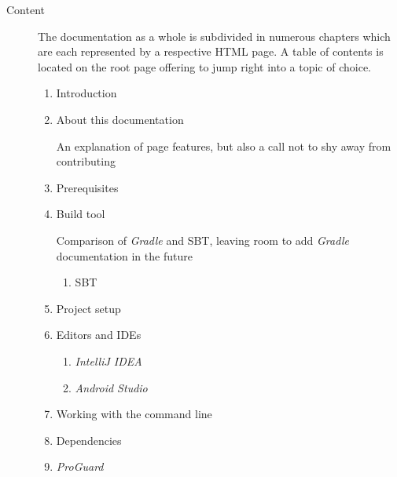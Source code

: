 \begin{description}

	\item[Content]\hfill

	The documentation as a whole is subdivided in numerous chapters which are each represented by a respective \ac{HTML} page. A table of contents is located on the root page offering to jump right into a topic of choice.

	\begin{enumerate}

		\item Introduction

		\item About this documentation

		An explanation of page features, but also a call not to shy away from contributing

		\item Prerequisites

		\item Build tool

		Comparison of \textit{Gradle} and \ac{SBT}, leaving room to add \textit{Gradle} documentation in the future

		\begin{enumerate}

			\item \ac{SBT}

		\end{enumerate}

		\item Project setup

		\item Editors and \acp{IDE}

		\begin{enumerate}

			\item \textit{IntelliJ IDEA}

			\item \textit{Android Studio}

		\end{enumerate}

		\item Working with the command line

		\item Dependencies

		\item \textit{ProGuard}

		\begin{enumerate}


\end{enumerate}
\end{enumerate}
\end{description}
